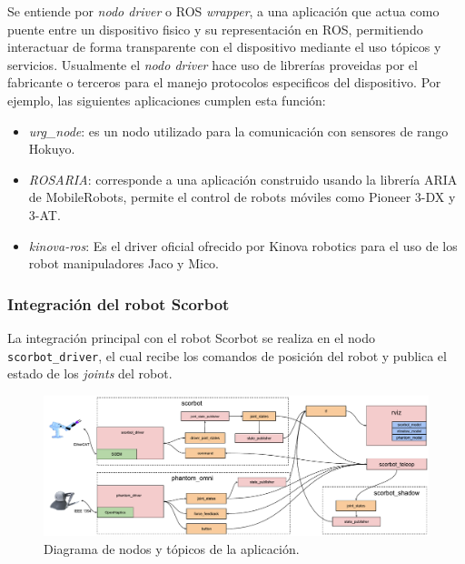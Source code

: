 Se entiende por \textit{nodo driver} o ROS \textit{wrapper}, a una aplicación que actua como puente entre un dispositivo fisico y su representación en ROS, permitiendo interactuar de forma transparente con el dispositivo mediante el uso tópicos y servicios. Usualmente el \textit{nodo driver} hace uso de librerías proveidas por el fabricante o terceros para el manejo protocolos especificos del dispositivo. Por ejemplo, las siguientes aplicaciones cumplen esta función:

\begin{itemize}
\item \textit{urg\_node}: es un nodo utilizado para la comunicación con sensores de rango Hokuyo.
\item \textit{ROSARIA}: corresponde a una aplicación construido usando la librería ARIA de MobileRobots, permite el control de robots móviles como Pioneer 3-DX y 3-AT.
\item \textit{kinova-ros}\cite{kinova}: Es el driver oficial ofrecido por Kinova robotics para el uso de los robot manipuladores Jaco y Mico.
\end{itemize}

\subsubsection{Integración del robot Scorbot}

La integración principal con el robot Scorbot se realiza en el nodo \texttt{scorbot\_driver}, el cual recibe los comandos de posición del robot y publica el estado de los \textit{joints} del robot.

\begin{figure}[ht]
  \centering
  \includegraphics[width=\textwidth]{img/cap4/scorbot_software.pdf}
  \caption{Diagrama de nodos y tópicos de la aplicación.}
  \label{cap4_scorbot_software}
\end{figure}

